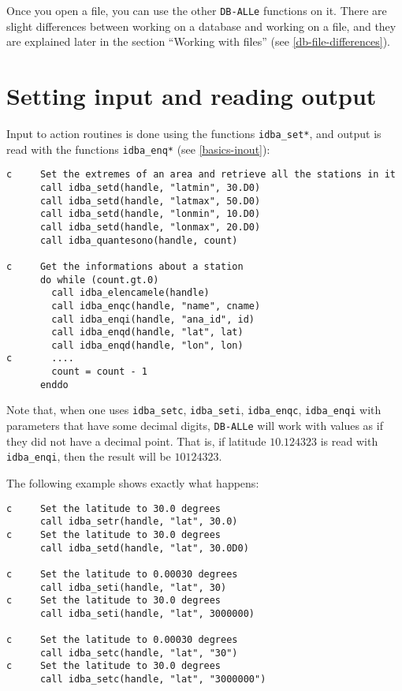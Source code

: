 \documentclass[final,12pt,a4paper,twoside]{book}
\newcommand{\dballe}{{\tt DB-ALLe}}
\begin{document}
Once you open a file, you can use the other \dballe{} functions on it.  There
are slight differences between working on a database and working on a file, and
they are explained later in the section ``Working with files'' (see \ref{db-file-differences}).


\section{Setting input and reading output}

Input to action routines is done using the functions {\tt idba\_set*}, and output
is read with the functions {\tt idba\_enq*} (see \ref{basics-inout}):

\begin{verbatim}
c     Set the extremes of an area and retrieve all the stations in it
      call idba_setd(handle, "latmin", 30.D0)
      call idba_setd(handle, "latmax", 50.D0)
      call idba_setd(handle, "lonmin", 10.D0)
      call idba_setd(handle, "lonmax", 20.D0)
      call idba_quantesono(handle, count)
   
c     Get the informations about a station
      do while (count.gt.0)
        call idba_elencamele(handle)
        call idba_enqc(handle, "name", cname)
        call idba_enqi(handle, "ana_id", id)
        call idba_enqd(handle, "lat", lat)
        call idba_enqd(handle, "lon", lon)
c       ....
        count = count - 1
      enddo
\end{verbatim}

Note that, when one uses {\tt idba\_setc}, {\tt idba\_seti}, {\tt idba\_enqc},
{\tt idba\_enqi} with parameters that have some decimal digits, \dballe{} will
work with values as if they did not have a decimal point.  That is, if latitude
$10.124323$ is read with {\tt idba\_enqi}, then the result will be $10124323$.

The following example shows exactly what happens:

\begin{verbatim}
c     Set the latitude to 30.0 degrees
      call idba_setr(handle, "lat", 30.0)
c     Set the latitude to 30.0 degrees
      call idba_setd(handle, "lat", 30.0D0)

c     Set the latitude to 0.00030 degrees
      call idba_seti(handle, "lat", 30)
c     Set the latitude to 30.0 degrees
      call idba_seti(handle, "lat", 3000000)

c     Set the latitude to 0.00030 degrees
      call idba_setc(handle, "lat", "30")
c     Set the latitude to 30.0 degrees
      call idba_setc(handle, "lat", "3000000")
\end{verbatim}
\end{document}
